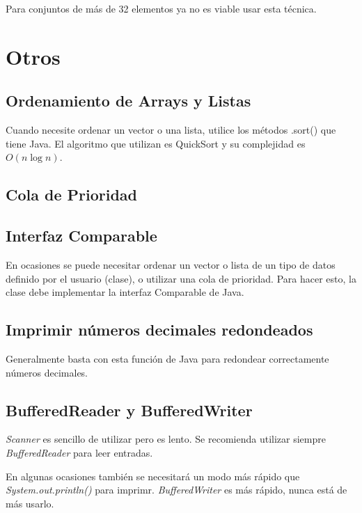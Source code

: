 \documentclass{article}
\begin{document}
\begin{multicols}{2}
Para conjuntos de más de 32 elementos ya no es viable usar esta técnica.

		
\section{Otros}
	\subsection{Ordenamiento de Arrays y Listas}
	Cuando necesite ordenar un vector o una lista, utilice los métodos .sort() que tiene 		Java. El algoritmo que utilizan es QuickSort y su complejidad es \( O(n\log n) \).	
	
	
	\subsection{Cola de Prioridad}
	
	\subsection{Interfaz Comparable}
	En ocasiones se puede necesitar ordenar un vector o lista de un tipo de datos definido por el usuario (clase), o utilizar una cola de prioridad. Para hacer esto, la clase debe implementar la interfaz Comparable de Java.
	
	\subsection{Imprimir números decimales redondeados}
	Generalmente basta con esta función de Java para redondear correctamente números decimales.	
	
	
	\subsection{BufferedReader y BufferedWriter}
	\emph{Scanner} es sencillo de utilizar pero es lento. Se recomienda utilizar siempre \emph{BufferedReader} para leer entradas.
	
	En algunas ocasiones también se necesitará un modo más rápido que \emph{System.out.println()} para imprimr. \emph{BufferedWriter} es más rápido, nunca está de más usarlo.
	

\end{multicols}	
\end{document}
